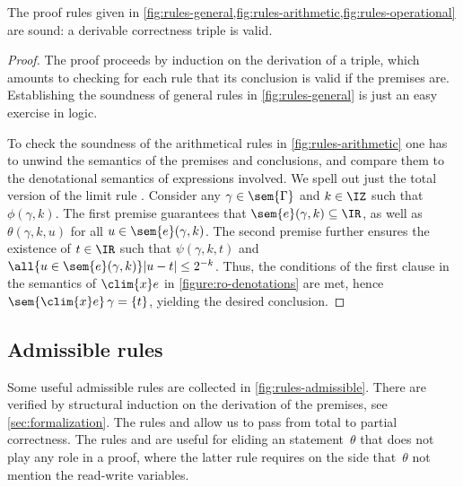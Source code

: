 \begin{theorem}\label{t:sound}
  The proof rules given in \cref{fig:rules-general,fig:rules-arithmetic,fig:rules-operational} are sound:
  a derivable correctness triple is valid.
\end{theorem}

\begin{proof}
  The proof proceeds by induction on the derivation of a triple, which amounts to checking for each rule that its conclusion is valid if the premises are.
  Establishing the soundness of general rules in \cref{fig:rules-general} is just an easy exercise in logic.

  To check the soundness of the arithmetical rules in \cref{fig:rules-arithmetic} one has to unwind the semantics of the premises and conclusions, and compare them to the denotational semantics of expressions involved.
  We spell out just the total version of the limit rule .
  Consider any $\gamma \in \sem{\Gamma}$ and $k \in \IZ$ such that $\phi(\gamma, k)$. The first premise guarantees that $\sem{e}(\gamma, k) \subseteq \IR$, as well as $\theta(\gamma, k, u)$ for all $u \in \sem{e}(\gamma, k)$.
  The second premise further ensures the existence of $t \in \IR$ such that $\psi(\gamma, k, t)$ and $\all{u \in \sem{e} (\gamma, k)} |u - t| \leq 2^{-k}$. Thus, the conditions of the first clause in the semantics of $\clim{x} e$ in \cref{figure:ro-denotations} are met, hence $\sem{\clim{x} e}\,\gamma = \{t\}$, yielding the desired conclusion.
\end{proof}

\subsection{Admissible rules}
\label{sec:admissible-rules}

Some useful admissible rules are collected in \cref{fig:rules-admissible}. There are verified by structural induction on the derivation of the premises, see \cref{sec:formalization}.
%
The rules  and  allow us to pass from total to partial correctness.
%
The rules  and  are useful for eliding an statement~$\theta$ that does not play any role in a proof, where the latter rule requires on the side that~$\theta$ not mention the read-write variables.


